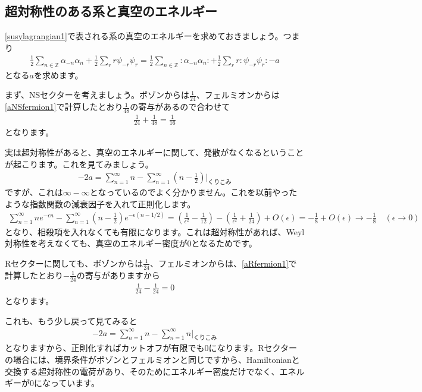 \documentclass[report,paper=a4, fontsize=12pt, line_length=16cm, number_of_lines=34,dvipdfmx]{jlreq}
\numberwithin{equation}{chapter}
\numberwithin{equation}{section}
\newcommand{\Zb}{\mathbb{Z}}
\begin{document}
\subsection{超対称性のある系と真空のエネルギー}

\eqref{susylagrangian1}で表される系の真空のエネルギーを求めておきましょう。つまり
\begin{align}
  \frac12 \sum_{n\in \Zb}\alpha_{-n}\alpha_{n}+\frac12 \sum_{r}r \psi_{-r}\psi_{r}
  =  \frac12 \sum_{n\in \Zb}:\alpha_{-n}\alpha_{n}:+\frac12 \sum_{r}r :\psi_{-r}\psi_{r}:-a
\end{align}
となる$a$を求めます。

まず、NSセクターを考えましょう。ボゾンからは$\frac{1}{24}$、フェルミオンからは\eqref{aNSfermion1}で計算したとおり$\frac{1}{48}$の寄与があるので合わせて
\begin{align}
  \frac{1}{24}+\frac{1}{48}=\frac{1}{16}\label{supervacuumenergyNS}
\end{align}
となります。

実は超対称性があると、真空のエネルギーに関して、発散がなくなるということが起こります。これを見てみましょう。
\begin{align}
  -2a=\sum_{n=1}^{\infty}n-\sum_{n=1}^{\infty}\left( n-\frac12 \right)　\Bigg|_{\text{くりこみ}}
\end{align}
ですが、これは$\infty-\infty$となっているのでよく分かりません。これを以前やったような指数関数の減衰因子を入れて正則化します。
\begin{align}
  \sum_{n=1}^{\infty}n e^{-\epsilon n}-\sum_{n=1}^{\infty}\left( n-\frac12 \right)e^{-\epsilon (n-1/2)}
  =\left( \frac{1}{\epsilon^2}-\frac{1}{12} \right)-\left( \frac{1}{\epsilon^2}+\frac{1}{24} \right)+O(\epsilon)
  =-\frac{1}{8}+O(\epsilon)\to -\frac{1}{8}\quad (\epsilon\to 0)
\end{align}
となり、相殺項を入れなくても有限になります。これは超対称性があれば、Weyl対称性を考えなくても、真空のエネルギー密度が$0$となるためです。

Rセクターに関しても、ボゾンからは$\frac{1}{24}$、フェルミオンからは、\eqref{aRfermion1}で計算したとおり$-\frac{1}{24}$の寄与がありますから
\begin{align}
  \frac{1}{24}-\frac{1}{24}=0\label{supervacuumenergyR}
\end{align}
となります。

これも、もう少し戻って見てみると
\begin{align}
  -2a=\sum_{n=1}^{\infty}n-\sum_{n=1}^{\infty}n　\Bigg|_{\text{くりこみ}}
\end{align}
となりますから、正則化すればカットオフが有限でも$0$になります。Rセクターの場合には、境界条件がボゾンとフェルミオンと同じですから、Hamiltonianと交換する超対称性の電荷があり、そのためにエネルギー密度だけでなく、エネルギーが$0$になっています。
\end{document}
